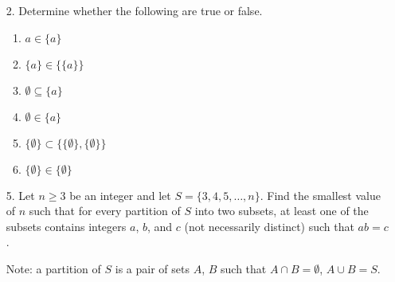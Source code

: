 \begin{enumerate}
    \item[2.] Determine whether the following are true or false.
        \begin{enumerate}
            \item $a \in \{a\}$
            \item $\{a\} \in \{\{a\}\}$
            \item $\emptyset \subseteq \{a\}$
            \item $\emptyset \in \{a\}$
            \item $\{\emptyset\} \subset \{\{\emptyset\}, \{\emptyset\}\}$
            \item $\{\emptyset\} \in \{\emptyset\}$
        \end{enumerate}
    \begin{solutiondraft}
    
    
    \end{solutiondraft}
    \begin{comment}
    \end{comment}



    
    \item[5.]Let $n \ge 3$ be an integer and let $S = \{3,4,5,\ldots,n\}$. Find the smallest value of $n$ such that for every partition of $S$ into two subsets, at least one of the subsets contains integers $a$, $b$, and $c$ (not necessarily distinct) such that $ab = c$.

    Note: a partition of $S$ is a pair of sets $A$, $B$ such that $A \cap B = \emptyset$, $A \cup B = S$. 
    \begin{solutiondraft}



        
    \end{solutiondraft}
    \begin{comment}
        here is where you type in your explain.
    \end{comment}





\end{enumerate}
